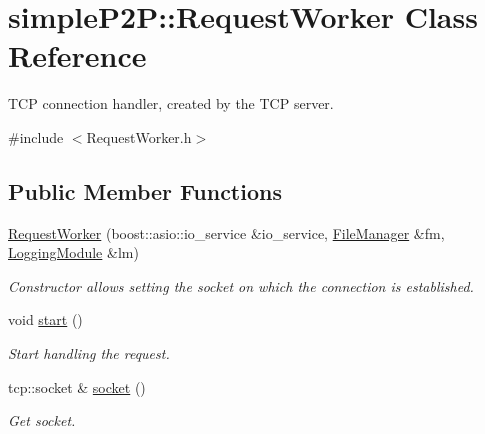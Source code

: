 \hypertarget{classsimpleP2P_1_1RequestWorker}{}\section{simple\+P2P\+:\+:Request\+Worker Class Reference}
\label{classsimpleP2P_1_1RequestWorker}


T\+CP connection handler, created by the T\+CP server.  




{\ttfamily \#include $<$Request\+Worker.\+h$>$}

\subsection*{Public Member Functions}
\begin{DoxyCompactItemize}
\item 
\hyperlink{classsimpleP2P_1_1RequestWorker_ad115dd761b5e9be155d0631c7392734a}{Request\+Worker} (boost\+::asio\+::io\+\_\+service \&io\+\_\+service, \hyperlink{classsimpleP2P_1_1FileManager}{File\+Manager} \&fm, \hyperlink{classsimpleP2P_1_1LoggingModule}{Logging\+Module} \&lm)
\begin{DoxyCompactList}\small\item\em Constructor allows setting the socket on which the connection is established. \end{DoxyCompactList}\item 
\mbox{\label{classsimpleP2P_1_1RequestWorker_a2581f6fe51f1140db9d1e7c9b33900ba}} 
void \hyperlink{classsimpleP2P_1_1RequestWorker_a2581f6fe51f1140db9d1e7c9b33900ba}{start} ()
\begin{DoxyCompactList}\small\item\em Start handling the request. \end{DoxyCompactList}\item 
\mbox{\label{classsimpleP2P_1_1RequestWorker_aaf449574acb97751ab086c519bb17955}} 
tcp\+::socket \& \hyperlink{classsimpleP2P_1_1RequestWorker_aaf449574acb97751ab086c519bb17955}{socket} ()
\begin{DoxyCompactList}\small\item\em Get socket. \end{DoxyCompactList}\end{DoxyCompactItemize}


